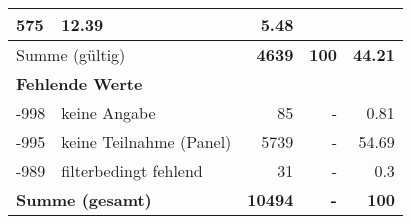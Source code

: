 \begin{longtable}{lXrrr}
       \num{575} &
       \num[round-mode=places,round-precision=2]{12,39} &
         \num[round-mode=places,round-precision=2]{5,48} \\
     \midrule
     \multicolumn{2}{l}{Summe (gültig)} &
       \textbf{\num{4639}} &
     \textbf{100} &
       \textbf{\num[round-mode=places,round-precision=2]{44,21}} \\
     \multicolumn{5}{l}{\textbf{Fehlende Werte}}\\
       -998 &
       keine Angabe &
         \num{85} &
        - &
         \num[round-mode=places,round-precision=2]{0,81} \\
       -995 &
       keine Teilnahme (Panel) &
         \num{5739} &
        - &
         \num[round-mode=places,round-precision=2]{54,69} \\
       -989 &
       filterbedingt fehlend &
         \num{31} &
        - &
         \num[round-mode=places,round-precision=2]{0,3} \\
     \midrule
     \multicolumn{2}{l}{\textbf{Summe (gesamt)}} &
          \textbf{\num{10494}} &
        \textbf{-} &
        \textbf{100} \\
     \bottomrule
     \end{longtable}
     
